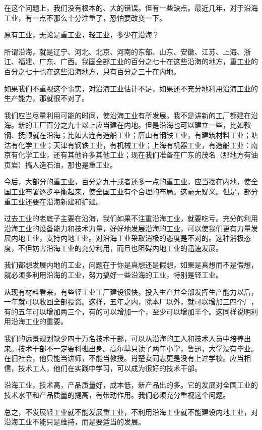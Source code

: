 在这个问题上，我们没有根本的、大的错误。但有一些缺点。最近几年，对于沿海工业，有一点不那么十分注重了，恐怕要改变一下。

原有工业，无论是重工业，轻工业，多少在沿海？

所谓沿海，就是辽宁、河北、北京、河南的东部、山东、安徽、江苏、上海、浙江、福建、广东、广西。我国全部工业的百分之七十在这些沿海的地方，重工业的百分之七十也在这些沿海地方，只有百分之三十在内地。

如果我们不重视这个事实，对沿海工业估计不足，如果还不充分地利用沿海工业的生产能力，那就很不对了。

我们应当尽量利用可能的时间，使沿海工业有所发展。我不是讲新的工厂都建在沿海。新的工厂百分之九十以上应当建在内地。但是沿海也可以建立一些，比如鞍钢、抚顺就在沿海；比如大连有造船工业；唐山有钢铁工业，有建筑材料工业；塘沽有化学工业；天津有钢铁工业，有机械工业；上海有机器工业，有造船工业：南京有化学工业，还有其他许多其他工业；现在我们准备在广东的茂名（那地方有油页岩）搞人造石油，那也是重工业。

今后，大部分的重工业，百分之九十或者还多一点的重工业，应当摆在内地，使全国工业布署逐步平衡起来，使全国工业有个合理的布局。这毫无疑义。但是，部分重工业还要在沿海新建和扩建。

过去工业的老底子主要在沿海，我们如果不注重沿海工业，就要吃亏。充分的利用沿海工业的设备能力和技术力量，好好地发展沿海的工业，可以使我们更有力量发展内地工业，支持内地工业。对沿海工业采取消极的态度是不对的。这种消极态度，不但妨害沿海工业的充分利用，而且也阻碍内地工业的迅速发展。

我们都想发展内地的工业，问题在于你是真想还是假想，如果是真想而不是假想，就必须多利用沿海的工业，努力搞好一些沿海的工业，特别是轻工业。

从现有材料看来，有些轻工业工厂建设很快，投入生产并全部发挥生产能力以后，一年就可以收回全部投资。这样，五年之内，除本厂以外，就可以增加三四个厂，有的五年可以增加两三个，有的可以增加一个，至少可以增加半个。这同样说明利用沿海工业的重要。

我们的远景规划缺少四十万名技术干部，可以从沿海的工人和技术人员中培养出来。技术干部不一定要科班出身。高尔基只读了两年小学，鲁迅，大学没有毕业。在旧社会，他只能当讲师，不能当教授。肖楚女同志更是没有上过学校。应当相信，技术工人，他们在实践中学习，可以成为很好的技术干部。

沿海工业，技术高，产品质量好，成本低，新产品出的多。它的发展对全国工业的技术水平和产品质量的提高，有带动作用。我们必须充分重视这个问题。

总之，不发展轻工业就不能发展重工业，不利用沿海工业就不能建设内地工业，对沿海工业不能只是维持，而是要适当的发展。

